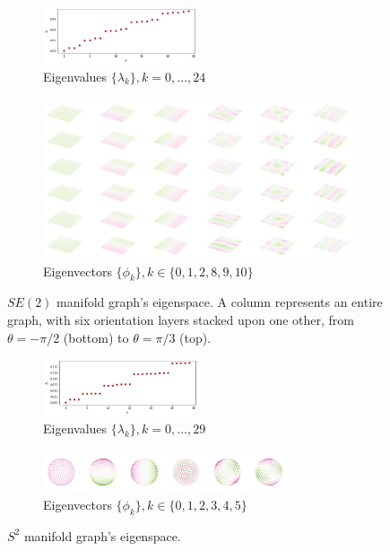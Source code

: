 \documentclass{article}
\begin{document}
\begin{figure}[h!] 
    \centering
    \begin{subfigure}[b]{0.9\textwidth}
        \centering
        \includegraphics[width=0.5\textwidth]{Images/se2_eigenvals.png}
        \caption{Eigenvalues $\{\lambda_k\}, k=0, \dots, 24$}
    \end{subfigure}
    \hfill
    \begin{subfigure}[b]{\textwidth}
        \centering
        \includegraphics[width=\textwidth]{Images/se2_eigenvecs.png}
        \caption{Eigenvectors $\{\phi_k\}, k \in \{0, 1, 2, 8, 9, 10\}$}
    \end{subfigure}
    \caption{$SE(2)$ manifold graph's eigenspace. A column represents an entire graph, with six orientation layers stacked upon one other, from $\theta = -\pi/2$ (bottom) to $\theta = \pi/3$ (top).}
    \label{fig:se2_eigenspace}
\end{figure}

\begin{figure}[h!] 
    \centering
    \begin{subfigure}[b]{0.9\textwidth}
        \centering
        \includegraphics[width=0.5\textwidth]{Images/s2_eigenvals.png}
        \caption{Eigenvalues $\{\lambda_k\}, k=0, \dots, 29$}
    \end{subfigure}
    \hfill
    \begin{subfigure}[b]{\textwidth}
        \centering
        \includegraphics[width=0.8\textwidth]{Images/s2_eigenvecs.png}
        \caption{Eigenvectors $\{\phi_k\}, k \in \{0, 1, 2, 3, 4, 5\}$}
    \end{subfigure}
    \caption{$S^2$ manifold graph's eigenspace.}
    \label{fig:s2_eigenspace}
\end{figure}
\end{document}
